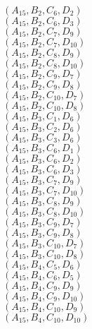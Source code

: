 \documentclass[14pt]{article}
\begin{document}
    $({A}_{15}, {B}_{2}, {C}_{6}, {D}_{2}) $ \\ 
    $({A}_{15}, {B}_{2}, {C}_{6}, {D}_{3}) $ \\ 
    $({A}_{15}, {B}_{2}, {C}_{7}, {D}_{9}) $ \\ 
    $({A}_{15}, {B}_{2}, {C}_{7}, {D}_{10}) $ \\ 
    $({A}_{15}, {B}_{2}, {C}_{8}, {D}_{9}) $ \\ 
    $({A}_{15}, {B}_{2}, {C}_{8}, {D}_{10}) $ \\ 
    $({A}_{15}, {B}_{2}, {C}_{9}, {D}_{7}) $ \\ 
    $({A}_{15}, {B}_{2}, {C}_{9}, {D}_{8}) $ \\ 
    $({A}_{15}, {B}_{2}, {C}_{10}, {D}_{7}) $ \\ 
    $({A}_{15}, {B}_{2}, {C}_{10}, {D}_{8}) $ \\ 
    $({A}_{15}, {B}_{3}, {C}_{1}, {D}_{6}) $ \\ 
    $({A}_{15}, {B}_{3}, {C}_{2}, {D}_{6}) $ \\ 
    $({A}_{15}, {B}_{3}, {C}_{3}, {D}_{6}) $ \\ 
    $({A}_{15}, {B}_{3}, {C}_{6}, {D}_{1}) $ \\ 
    $({A}_{15}, {B}_{3}, {C}_{6}, {D}_{2}) $ \\ 
    $({A}_{15}, {B}_{3}, {C}_{6}, {D}_{3}) $ \\ 
    $({A}_{15}, {B}_{3}, {C}_{7}, {D}_{9}) $ \\ 
    $({A}_{15}, {B}_{3}, {C}_{7}, {D}_{10}) $ \\ 
    $({A}_{15}, {B}_{3}, {C}_{8}, {D}_{9}) $ \\ 
    $({A}_{15}, {B}_{3}, {C}_{8}, {D}_{10}) $ \\ 
    $({A}_{15}, {B}_{3}, {C}_{9}, {D}_{7}) $ \\ 
    $({A}_{15}, {B}_{3}, {C}_{9}, {D}_{8}) $ \\ 
    $({A}_{15}, {B}_{3}, {C}_{10}, {D}_{7}) $ \\ 
    $({A}_{15}, {B}_{3}, {C}_{10}, {D}_{8}) $ \\ 
    $({A}_{15}, {B}_{4}, {C}_{5}, {D}_{6}) $ \\ 
    $({A}_{15}, {B}_{4}, {C}_{6}, {D}_{5}) $ \\ 
    $({A}_{15}, {B}_{4}, {C}_{9}, {D}_{9}) $ \\ 
    $({A}_{15}, {B}_{4}, {C}_{9}, {D}_{10}) $ \\ 
    $({A}_{15}, {B}_{4}, {C}_{10}, {D}_{9}) $ \\ 
    $({A}_{15}, {B}_{4}, {C}_{10}, {D}_{10}) $ \\ 
\end{document}
